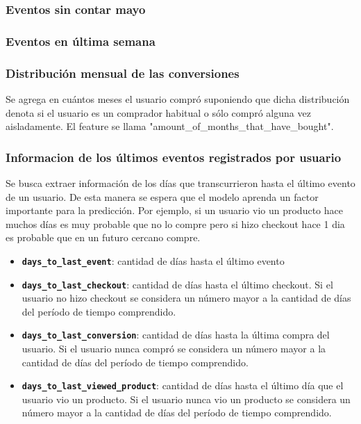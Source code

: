 \documentclass[a4paper]{article}
\begin{document}
\subsubsection{Eventos sin contar mayo}

\subsubsection{Eventos en última semana}

\subsubsection{Distribución mensual de las conversiones}

Se agrega en cuántos meses el usuario compró suponiendo que dicha distribución denota si el usuario es un comprador habitual o sólo compró alguna vez aisladamente. El feature se llama "amount\_of\_months\_that\_have\_bought".

\subsubsection{Informacion de los últimos eventos registrados por usuario}

Se busca extraer información de los días que transcurrieron hasta el último evento de un usuario. De esta manera se espera que el modelo aprenda un factor importante para la predicción. Por ejemplo, si un usuario vio un producto hace muchos días es muy probable que no lo compre pero si hizo checkout hace 1 dia es probable que en un futuro cercano compre.

\begin{itemize}
	\item \textbf{\texttt{days\_to\_last\_event}}: cantidad de días hasta el último evento
	\item \textbf{\texttt{days\_to\_last\_checkout}}: cantidad de días hasta el último checkout. Si el usuario no hizo checkout se considera un número mayor a la cantidad de días del período de tiempo comprendido.
	\item \textbf{\texttt{days\_to\_last\_conversion}}: cantidad de días hasta la última compra del usuario. Si el usuario nunca compró se considera un número mayor a la cantidad de días del período de tiempo comprendido.
	\item \textbf{\texttt{days\_to\_last\_viewed\_product}}: cantidad de días hasta el último día que el usuario vio un producto. Si el usuario nunca vio un producto se considera un número mayor a la cantidad de días del período de tiempo comprendido.
\end{itemize}
	
\end{document}
